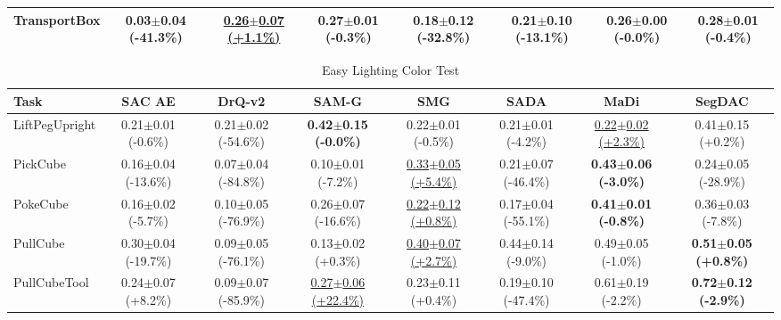 \begin{table}[htbp]
\begin{adjustbox}{max width=\textwidth}
\begin{tabular}{l*{7}{c}}
TransportBox & 0.03$\pm$0.04 \scriptsize{(-41.3\%)} & \underline{0.26$\pm$0.07 \scriptsize{(+1.1\%)}} & 0.27$\pm$0.01 \scriptsize{(-0.3\%)} & 0.18$\pm$0.12 \scriptsize{(-32.8\%)} & 0.21$\pm$0.10 \scriptsize{(-13.1\%)} & 0.26$\pm$0.00 \scriptsize{(-0.0\%)} & \textbf{0.28$\pm$0.01 \scriptsize{(-0.4\%)}} \\
\bottomrule
\end{tabular}
\end{adjustbox}
\end{table}

\begin{table}[htbp]
\centering
\scriptsize
\caption{Easy Lighting Color Test}
\label{tab:appendix_lightingcolortest_easy}
\begin{adjustbox}{max width=\textwidth}
\begin{tabular}{l*{7}{c}}
\toprule
\textbf{Task} & \textbf{SAC AE} & \textbf{DrQ-v2} & \textbf{SAM-G} & \textbf{SMG} & \textbf{SADA} & \textbf{MaDi} & \textbf{SegDAC} \\
\midrule
LiftPegUpright & 0.21$\pm$0.01 \scriptsize{(-0.6\%)} & 0.21$\pm$0.02 \scriptsize{(-54.6\%)} & \textbf{0.42$\pm$0.15 \scriptsize{(-0.0\%)}} & 0.22$\pm$0.01 \scriptsize{(-0.5\%)} & 0.21$\pm$0.01 \scriptsize{(-4.2\%)} & \underline{0.22$\pm$0.02 \scriptsize{(+2.3\%)}} & 0.41$\pm$0.15 \scriptsize{(+0.2\%)} \\
PickCube & 0.16$\pm$0.04 \scriptsize{(-13.6\%)} & 0.07$\pm$0.04 \scriptsize{(-84.8\%)} & 0.10$\pm$0.01 \scriptsize{(-7.2\%)} & \underline{0.33$\pm$0.05 \scriptsize{(+5.4\%)}} & 0.21$\pm$0.07 \scriptsize{(-46.4\%)} & \textbf{0.43$\pm$0.06 \scriptsize{(-3.0\%)}} & 0.24$\pm$0.05 \scriptsize{(-28.9\%)} \\
PokeCube & 0.16$\pm$0.02 \scriptsize{(-5.7\%)} & 0.10$\pm$0.05 \scriptsize{(-76.9\%)} & 0.26$\pm$0.07 \scriptsize{(-16.6\%)} & \underline{0.22$\pm$0.12 \scriptsize{(+0.8\%)}} & 0.17$\pm$0.04 \scriptsize{(-55.1\%)} & \textbf{0.41$\pm$0.01 \scriptsize{(-0.8\%)}} & 0.36$\pm$0.03 \scriptsize{(-7.8\%)} \\
PullCube & 0.30$\pm$0.04 \scriptsize{(-19.7\%)} & 0.09$\pm$0.05 \scriptsize{(-76.1\%)} & 0.13$\pm$0.02 \scriptsize{(+0.3\%)} & \underline{0.40$\pm$0.07 \scriptsize{(+2.7\%)}} & 0.44$\pm$0.14 \scriptsize{(-9.0\%)} & 0.49$\pm$0.05 \scriptsize{(-1.0\%)} & \textbf{0.51$\pm$0.05 \scriptsize{(+0.8\%)}} \\
PullCubeTool & 0.24$\pm$0.07 \scriptsize{(+8.2\%)} & 0.09$\pm$0.07 \scriptsize{(-85.9\%)} & \underline{0.27$\pm$0.06 \scriptsize{(+22.4\%)}} & 0.23$\pm$0.11 \scriptsize{(+0.4\%)} & 0.19$\pm$0.10 \scriptsize{(-47.4\%)} & 0.61$\pm$0.19 \scriptsize{(-2.2\%)} & \textbf{0.72$\pm$0.12 \scriptsize{(-2.9\%)}} \\

\end{tabular}
\end{adjustbox}
\end{table}
